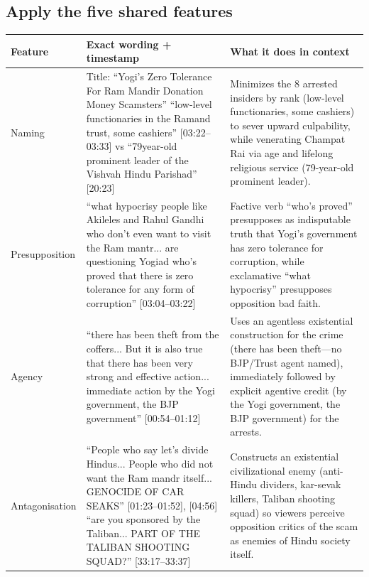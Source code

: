 \documentclass[10pt,a4paper]{article}
\begin{document}
\subsection*{Apply the five shared features}
\par\vspace{4pt}
{\small
\begin{longtable}{@{}>{\raggedright\arraybackslash}p{} >{\raggedright\arraybackslash}p{} >{\raggedright\arraybackslash}p{}@{}}
\toprule
\textbf{Feature} & \textbf{Exact wording + timestamp} & \textbf{What it does in context} \\
\midrule
\endhead
Naming & Title: ``Yogi's Zero Tolerance For Ram Mandir Donation Money Scamsters'' \newline  ``low-level functionaries in the Ramand trust, some cashiers'' [03:22--03:33] vs ``79year-old prominent leader of the Vishvah Hindu Parishad'' [20:23] & Minimizes the 8 arrested insiders by rank (low-level functionaries, some cashiers) to sever upward culpability, while venerating Champat Rai via age and lifelong religious service (79-year-old prominent leader). \\
\addlinespace[6pt]
Presupposition & ``what hypocrisy people like Akileles and Rahul Gandhi who don't even want to visit the Ram mantr... are questioning Yogiad who's proved that there is zero tolerance for any form of corruption'' [03:04--03:22] & Factive verb ``who's proved'' presupposes as indisputable truth that Yogi's government has zero tolerance for corruption, while exclamative ``what hypocrisy'' presupposes opposition bad faith. \\
\addlinespace[6pt]
Agency & ``there has been theft from the coffers... But it is also true that there has been very strong and effective action... immediate action by the Yogi government, the BJP government'' [00:54--01:12] & Uses an agentless existential construction for the crime (there has been theft---no BJP/Trust agent named), immediately followed by explicit agentive credit (by the Yogi government, the BJP government) for the arrests. \\
\addlinespace[6pt]
Antagonisation & ``People who say let's divide Hindus... People who did not want the Ram mandr itself... GENOCIDE OF CAR SEAKS'' [01:23--01:52], [04:56] \newline  ``are you sponsored by the Taliban... PART OF THE TALIBAN SHOOTING SQUAD?'' [33:17--33:37] & Constructs an existential civilizational enemy (anti-Hindu dividers, kar-sevak killers, Taliban shooting squad) so viewers perceive opposition critics of the scam as enemies of Hindu society itself. \\

\end{longtable}}
\end{document}
